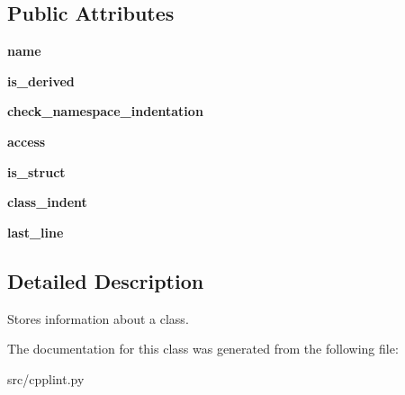 \subsection*{Public Attributes}
\begin{DoxyCompactItemize}
\item 
{\bfseries name}\hypertarget{classcpplint_1_1__ClassInfo_a3de5f207d3449d735d15ebca779fe336}{}\label{classcpplint_1_1__ClassInfo_a3de5f207d3449d735d15ebca779fe336}

\item 
{\bfseries is\+\_\+derived}\hypertarget{classcpplint_1_1__ClassInfo_a8cace481686fbbb35a1da552646aa9f4}{}\label{classcpplint_1_1__ClassInfo_a8cace481686fbbb35a1da552646aa9f4}

\item 
{\bfseries check\+\_\+namespace\+\_\+indentation}\hypertarget{classcpplint_1_1__ClassInfo_a0ead95c17ac0b293d0d371eb7b414bd9}{}\label{classcpplint_1_1__ClassInfo_a0ead95c17ac0b293d0d371eb7b414bd9}

\item 
{\bfseries access}\hypertarget{classcpplint_1_1__ClassInfo_aef1251c699b50c6603ce38ca8cce414c}{}\label{classcpplint_1_1__ClassInfo_aef1251c699b50c6603ce38ca8cce414c}

\item 
{\bfseries is\+\_\+struct}\hypertarget{classcpplint_1_1__ClassInfo_a57b443f42838d73183921d661b6fe4ef}{}\label{classcpplint_1_1__ClassInfo_a57b443f42838d73183921d661b6fe4ef}

\item 
{\bfseries class\+\_\+indent}\hypertarget{classcpplint_1_1__ClassInfo_adc7d328734cc58fe46a3a3f323a09f4a}{}\label{classcpplint_1_1__ClassInfo_adc7d328734cc58fe46a3a3f323a09f4a}

\item 
{\bfseries last\+\_\+line}\hypertarget{classcpplint_1_1__ClassInfo_a72e0f4576cdcb6f3886ed52e2affbc75}{}\label{classcpplint_1_1__ClassInfo_a72e0f4576cdcb6f3886ed52e2affbc75}

\end{DoxyCompactItemize}


\subsection{Detailed Description}
\begin{DoxyVerb}Stores information about a class.\end{DoxyVerb}
 

The documentation for this class was generated from the following file\+:\begin{DoxyCompactItemize}
\item 
src/cpplint.\+py\end{DoxyCompactItemize}
